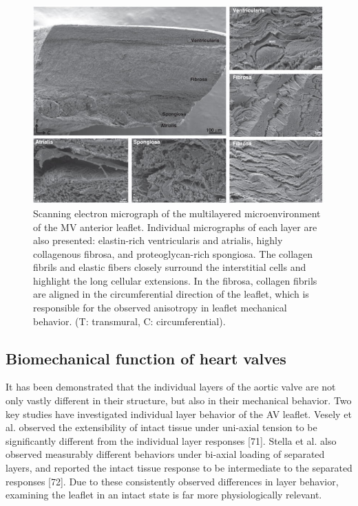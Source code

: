 \begin{figure}
\centering
\includegraphics[width=\textwidth]{Images/chapter1/valvelayers.jpg}
\caption{Scanning electron micrograph of the multilayered microenvironment of the MV anterior leaflet. Individual micrographs of each layer are also presented: elastin-rich ventricularis and atrialis, highly collagenous fibrosa, and proteoglycan-rich spongiosa. The collagen fibrils and elastic fibers closely surround the interstitial cells and highlight the long cellular extensions. In the fibrosa, collagen fibrils are aligned in the circumferential direction of the leaflet, which is responsible for the observed anisotropy in leaflet mechanical behavior. (T: transmural, C: circumferential). \cite{salma_heart_2016}}
\label{fig:valvelayers}
\end{figure}




\subsection{Biomechanical function of heart valves}

It has been demonstrated that the individual layers of the aortic valve are not only vastly different in their structure, but also in their mechanical behavior. Two key studies have investigated individual layer behavior of the AV leaflet. Vesely et al. observed the extensibility of intact tissue under uni-axial tension to be significantly different from the individual layer responses [71]. Stella et al. also observed measurably different behaviors under bi-axial loading of separated layers, and reported the intact tissue response to be intermediate to the separated responses [72]. Due to these consistently observed differences in layer behavior, examining the leaflet in an intact state is far more physiologically relevant. 